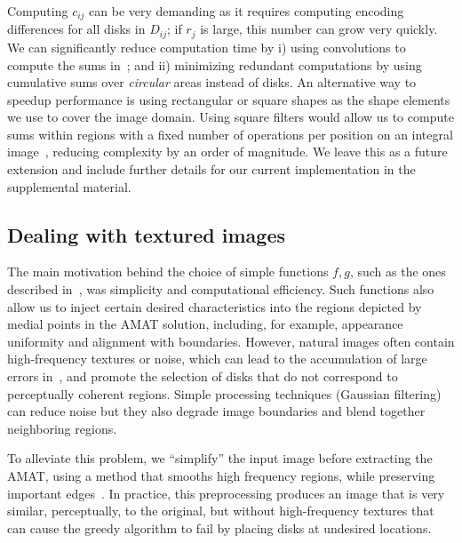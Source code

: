 \documentclass[10pt,twocolumn,letterpaper]{article}
\begin{document}
Computing $c_{ij}$ can be very demanding as it requires computing encoding differences for all 
disks in $D_{ij}$; if $r_j$ is large, this number can grow very quickly.
We can significantly reduce computation time by i) using convolutions to compute the sums in~;
and ii) minimizing redundant computations by using cumulative sums over \emph{circular} areas instead of disks.
An alternative way to speedup performance is using rectangular or square shapes as the
shape elements we use to cover the image domain.
Using square filters would allow us to compute sums within regions with a fixed number of operations per position on an integral
image~\cite{viola2001rapid,arbelaez2011contour}, reducing complexity by an order of magnitude.
We leave this as a future extension and include further details for our current implementation in the supplemental material.


\subsection{Dealing with textured images}\label{sec:implementation:texture}
The main motivation behind the choice of simple functions $f,g$, such as the ones described in~, was simplicity and 
computational efficiency.
Such functions also allow us to inject certain desired characteristics into the regions depicted by medial points in the AMAT solution, 
including, for example, appearance uniformity and alignment with boundaries.
However, natural images often contain high-frequency textures or noise, which can lead to the accumulation of large errors 
in~, and promote the selection of disks that do not correspond to perceptually coherent regions. 
Simple processing techniques (\eg Gaussian filtering) can reduce noise but they also degrade image boundaries and
blend together neighboring regions.

To alleviate this problem, we ``simplify'' the input image before extracting the AMAT, using a method that smooths high frequency
regions, while preserving important edges~\cite{xu2011image}.
In practice, this preprocessing produces an image that is very similar, perceptually, to the original, 
but without high-frequency textures that can cause the greedy algorithm to fail by placing disks at undesired locations.
\end{document}
